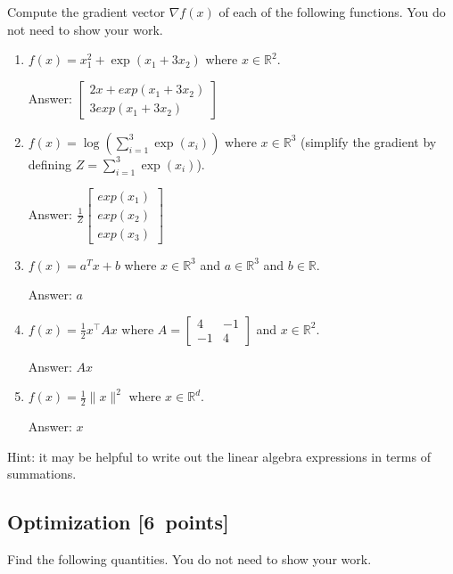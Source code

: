 \documentclass{article}
\newcommand{\blu}[1]{{\textcolor{blu}{#1}}}
\newenvironment{answer}{\par\begingroup\color{gre}Answer: }{\endgroup}
\let\ask\blu
\newcommand\pts[1]{\textcolor{pointscolour}{[#1~points]}}
\def\R{\mathbb{R}}
\newcommand{\norm}[1]{\lVert #1 \rVert}
\begin{document}
  \ask{Compute the gradient vector $\nabla f(x)$ of each of the following functions.} You do not need to show your work.
  \begin{enumerate}
  \item $f(x) = x_1^2 + \exp(x_1 + 3x_2)$ where $x \in \R^2$.
  \begin{answer}
    $\left[\begin{array}{c}
      2x + exp(x_1 + 3x_2)\\
      3exp(x_1 + 3x_2)
    \end{array}\right]$
  \end{answer}
  \item $f(x) = \log\left(\sum_{i=1}^3\exp(x_i)\right)$ where $x \in \R^3$ (simplify the gradient by defining $Z = \sum_{i=1}^3\exp(x_i)$).
  \begin{answer}
    $\frac{1}{Z}\left[\begin{array}{c}
      exp(x_1)\\
      exp(x_2)\\
      exp(x_3)
    \end{array}\right]$
  \end{answer}
  \item $f(x) = a^Tx + b$ where $x \in \R^3$ and $a \in \R^3$ and $b \in \R$.
  \begin{answer}
    $a$
  \end{answer}
  \item $f(x) = \frac12 x^\top A x$ where $A=\left[ \begin{array}{cc}
  4 & -1 \\
  -1 & 4 \end{array} \right]$ and $x \in \mathbb{R}^2$.
  \begin{answer}
    $Ax$
  \end{answer}
  \item $f(x) = \frac{1}{2}\norm{x}^2$ where $x \in \R^d$.
  \begin{answer}
    $x$
  \end{answer}
  \end{enumerate}

  Hint: it may be helpful to write out the linear algebra expressions in terms of summations.


  \subsection{Optimization \pts{6}}

  \ask{Find the following quantities.} You do not need to show your work.
\end{document}
